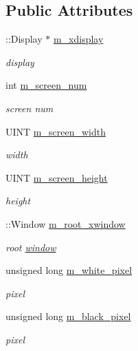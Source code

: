 \subsection*{Public Attributes}
\begin{DoxyCompactItemize}
\item 
::Display $\ast$ \hyperlink{classnebula_1_1platform_1_1platform_1_1lin_1_1base_af2debfefc99156129a9b5f59dc4951e8}{m\_\-xdisplay}
\begin{DoxyCompactList}\small\item\em display \item\end{DoxyCompactList}\item 
int \hyperlink{classnebula_1_1platform_1_1platform_1_1lin_1_1base_aeebbd6ba56278fcb9ef7f13b301c2b1e}{m\_\-screen\_\-num}
\begin{DoxyCompactList}\small\item\em screen num \item\end{DoxyCompactList}\item 
UINT \hyperlink{classnebula_1_1platform_1_1platform_1_1lin_1_1base_a6a975ac9673882057561a11736555d3f}{m\_\-screen\_\-width}
\begin{DoxyCompactList}\small\item\em width \item\end{DoxyCompactList}\item 
UINT \hyperlink{classnebula_1_1platform_1_1platform_1_1lin_1_1base_a10eb66f7e862a2d101af199609cb9a7c}{m\_\-screen\_\-height}
\begin{DoxyCompactList}\small\item\em height \item\end{DoxyCompactList}\item 
::Window \hyperlink{classnebula_1_1platform_1_1platform_1_1lin_1_1base_a21289b807f7361be9c7555abd2abd37b}{m\_\-root\_\-xwindow}
\begin{DoxyCompactList}\small\item\em root \hyperlink{namespacenebula_1_1platform_1_1window}{window} \item\end{DoxyCompactList}\item 
unsigned long \hyperlink{classnebula_1_1platform_1_1platform_1_1lin_1_1base_acc675a81632a7eb163c28a8e8ac9a08a}{m\_\-white\_\-pixel}
\begin{DoxyCompactList}\small\item\em pixel \item\end{DoxyCompactList}\item 
unsigned long \hyperlink{classnebula_1_1platform_1_1platform_1_1lin_1_1base_a97b55fe425a0b4232427e107da26f0cd}{m\_\-black\_\-pixel}
\begin{DoxyCompactList}\small\item\em pixel \item\end{DoxyCompactList}\end{DoxyCompactItemize}


